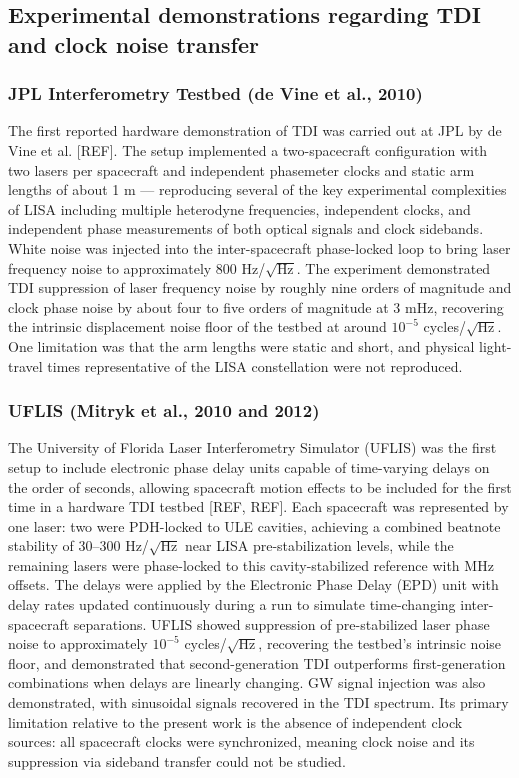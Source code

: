\subsection{Experimental demonstrations regarding TDI and clock noise transfer}
\subsubsection{JPL Interferometry Testbed (de Vine et al., 2010)}

The first reported hardware demonstration of TDI was carried out at JPL by de Vine et al. [REF]. The setup implemented a two-spacecraft configuration with two lasers per spacecraft and independent phasemeter clocks and static arm lengths of about 1 m — reproducing several of the key experimental complexities of LISA including multiple heterodyne frequencies, independent clocks, and independent phase measurements of both optical signals and clock sidebands. White noise was injected into the inter-spacecraft phase-locked loop to bring laser frequency noise to approximately 800 Hz/$\sqrt{\text{Hz}}$. The experiment demonstrated TDI suppression of laser frequency noise by roughly nine orders of magnitude and clock phase noise by about four to five orders of magnitude at 3 mHz, recovering the intrinsic displacement noise floor of the testbed at around $10^{-5}$ cycles/$\sqrt{\text{Hz}}$. One limitation was that the arm lengths were static and short, and physical light-travel times representative of the LISA constellation were not reproduced.

\subsubsection{UFLIS (Mitryk et al., 2010 and 2012)}
The University of Florida Laser Interferometry Simulator (UFLIS) was the first setup to include electronic phase delay units capable of time-varying delays on the order of seconds, allowing spacecraft motion effects to be included for the first time in a hardware TDI testbed [REF, REF]. Each spacecraft was represented by one laser: two were PDH-locked to ULE cavities, achieving a combined beatnote stability of 30–300 Hz/$\sqrt{\text{Hz}}$ near LISA pre-stabilization levels, while the remaining lasers were phase-locked to this cavity-stabilized reference with MHz offsets. The delays were applied by the Electronic Phase Delay (EPD) unit with delay rates updated continuously during a run to simulate time-changing inter-spacecraft separations. UFLIS showed suppression of pre-stabilized laser phase noise to approximately $10^{-5}$ cycles/$\sqrt{\text{Hz}}$, recovering the testbed's intrinsic noise floor, and demonstrated that second-generation TDI outperforms first-generation combinations when delays are linearly changing. GW signal injection was also demonstrated, with sinusoidal signals recovered in the TDI spectrum. Its primary limitation relative to the present work is the absence of independent clock sources: all spacecraft clocks were synchronized, meaning clock noise and its suppression via sideband transfer could not be studied.

